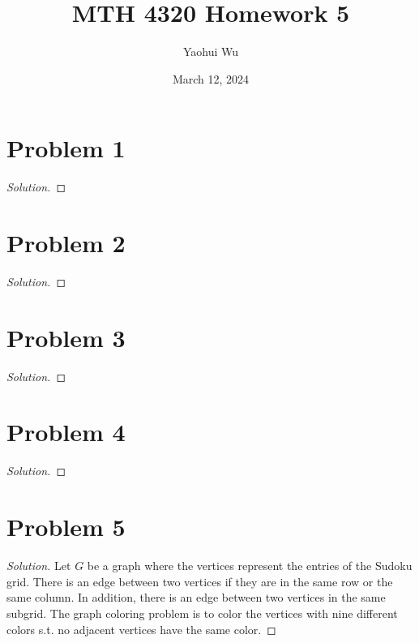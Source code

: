 \documentclass[12pt]{article}
\title{MTH 4320 Homework 5}
\author{Yaohui Wu}
\date{March 12, 2024}
\newenvironment*{solution}{\begin{proof}[Solution]}{\end{proof}}
\begin{document}
\maketitle
\section*{Problem 1}
\begin{solution}
    
\end{solution}
\section*{Problem 2}
\begin{solution}
    
\end{solution}
\section*{Problem 3}
\begin{solution}
    
\end{solution}
\section*{Problem 4}
\begin{solution}
    
\end{solution}
\section*{Problem 5}
\begin{solution}
    Let \(G\) be a graph where the vertices represent the entries of the
    Sudoku grid. There is an edge between two vertices if they are in the same
    row or the same column. In addition, there is an edge between two vertices
    in the same subgrid. The graph coloring problem is to color the vertices
    with nine different colors s.t. no adjacent vertices have the same color.
\end{solution}
\end{document}
